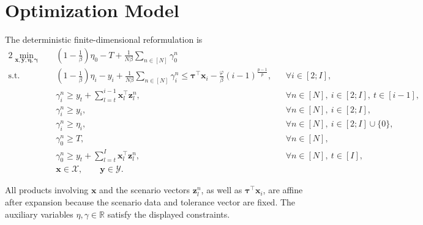 \documentclass[12pt,a4paper]{article}
\begin{document}
\section*{Optimization Model}
The deterministic finite-dimensional reformulation is
\begin{alignat}{2}
\min_{\boldsymbol{x},\boldsymbol{y},\boldsymbol{\eta},\boldsymbol{\gamma}}\quad
&\left(1-\frac{1}{\beta}\right)\eta_0-T
+\frac{1}{N\beta}\sum_{n\in[N]}\gamma_0^n
\label{eq:objective}\\[0.5em]
\text{s.t.}\quad
&\left(1-\frac{1}{\beta}\right)\eta_i-y_i
+\frac{1}{N\beta}\sum_{n\in[N]}\gamma_i^n
\le \boldsymbol{\tau}^{\top}\boldsymbol{x}_i
-\frac{\varphi}{\beta}(i-1)^{\frac{p-1}{p}},
&&\forall i\in[2;I],
\label{eq:delay-cvar}\\
&\gamma_i^n\ge y_t+
\sum_{l=t}^{i-1}\boldsymbol{x}_l^{\top}\boldsymbol{z}_l^n,
&&\forall n\in[N],\ i\in[2;I],\ t\in[i-1],
\label{eq:delay-scenario}\\
&\gamma_i^n\ge y_i,
&&\forall n\in[N],\ i\in[2;I],
\label{eq:appointment-scenario}\\
&\gamma_i^n\ge\eta_i,
&&\forall n\in[N],\ i\in[2;I]\cup\{0\},
\label{eq:threshold-scenario}\\
&\gamma_0^n\ge T,
&&\forall n\in[N],
\label{eq:overtime-horizon}\\
&\gamma_0^n\ge y_t+
\sum_{l=t}^{I}\boldsymbol{x}_l^{\top}\boldsymbol{z}_l^n,
&&\forall n\in[N],\ t\in[I],
\label{eq:overtime-scenario}\\
&\boldsymbol{x}\in\mathcal{X},\qquad \boldsymbol{y}\in\mathcal{Y}.&&
\label{eq:domains}
\end{alignat}

All products involving $\boldsymbol{x}$ and the scenario vectors $\boldsymbol{z}_l^n$, as well as $\boldsymbol{\tau}^{\top}\boldsymbol{x}_i$, are affine after expansion because the scenario data and tolerance vector are fixed. The auxiliary variables $\eta,\gamma\in\mathbb R$ satisfy the displayed constraints.
\end{document}
